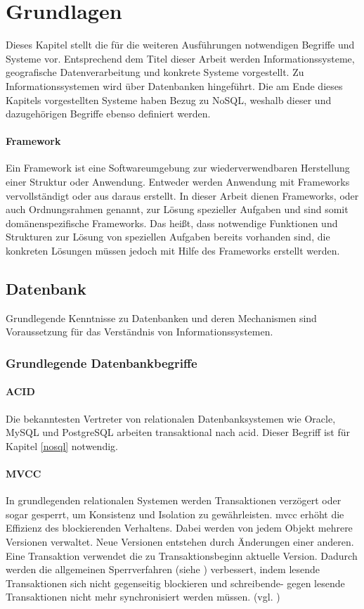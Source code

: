 \chapter{Grundlagen}
\label{Grundlagen}

Dieses Kapitel stellt die für die weiteren Ausführungen notwendigen Begriffe und Systeme vor.
Entsprechend dem Titel dieser Arbeit werden Informationssysteme, geografische Datenverarbeitung und konkrete Systeme vorgestellt.
Zu Informationssystemen wird über Datenbanken hingeführt.
Die am Ende dieses Kapitels vorgestellten Systeme haben Bezug zu NoSQL, weshalb dieser und dazugehörigen Begriffe ebenso definiert werden.


\subsubsection{Framework}
Ein Framework ist eine Softwareumgebung zur wiederverwendbaren Herstellung einer Struktur oder Anwendung.
Entweder werden Anwendung mit Frameworks vervollständigt oder aus daraus erstellt.
In dieser Arbeit dienen Frameworks, oder auch Ordnungsrahmen genannt, zur Lösung spezieller Aufgaben und sind somit domänenspezifische Frameworks.
Das heißt, dass notwendige Funktionen und Strukturen zur Lösung von speziellen Aufgaben bereits vorhanden sind, die konkreten Lösungen müssen jedoch mit Hilfe des Frameworks erstellt werden.

\section{Datenbank}

Grundlegende Kenntnisse zu Datenbanken und deren Mechanismen sind Voraussetzung für das Verständnis von Informationssystemen.

\subsection{Grundlegende Datenbankbegriffe}

\subsubsection{ACID}
Die bekanntesten Vertreter von relationalen Datenbanksystemen wie Oracle, MySQL und PostgreSQL arbeiten transaktional nach \Gls{acid}.
Dieser Begriff ist für Kapitel \ref{nosql} notwendig.

\subsubsection{MVCC}
In grundlegenden relationalen Systemen werden Transaktionen verzögert oder sogar gesperrt, um Konsistenz und Isolation zu gewährleisten.
\Gls{mvcc} erhöht die Effizienz des  blockierenden Verhaltens.
Dabei werden von jedem Objekt mehrere Versionen verwaltet.
Neue Versionen entstehen durch Änderungen einer anderen.
Eine Transaktion verwendet die zu Transaktionsbeginn aktuelle Version.
Dadurch werden die allgemeinen Sperrverfahren (siehe \cite[S.266 ff.]{book:kudrass}) verbessert, indem lesende Transaktionen sich nicht gegenseitig blockieren und schreibende- gegen lesende Transaktionen nicht mehr synchronisiert werden müssen. (vgl. \cite[S.270]{book:kudrass})

